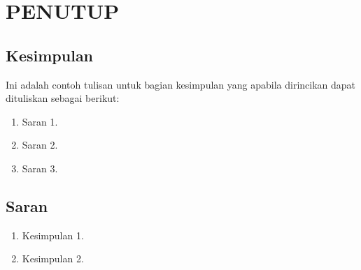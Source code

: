 \renewcommand{\thechapter}{\Roman{chapter}}
\chapter{PENUTUP}
\renewcommand{\thechapter}{\arabic{chapter}}

\section{Kesimpulan}

Ini adalah contoh tulisan untuk bagian kesimpulan yang apabila dirincikan dapat dituliskan sebagai berikut:

\begin{enumerate}
    \item Saran 1. 
    \item Saran 2.
    \item Saran 3.
\end{enumerate}

\section{Saran}
\begin{enumerate}
    \item Kesimpulan 1.
    \item Kesimpulan 2.
\end{enumerate}

